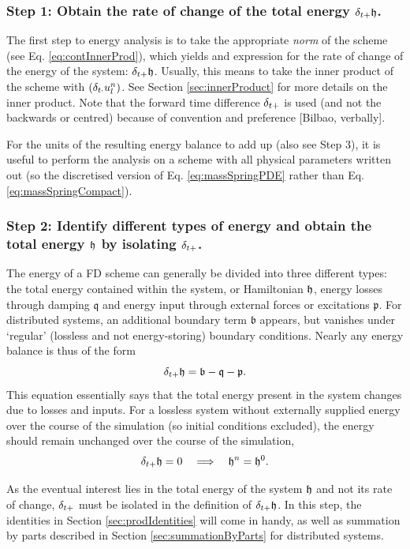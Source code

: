 {{\subsubsection{Step 1: Obtain the rate of change of the total energy $\delta_{t+} \mathfrak{h}$.}
The first step to energy analysis is to take the appropriate \textit{norm} of the scheme (see Eq. \eqref{eq:contInnerProd}), which yields and expression for the rate of change of the energy of the system: $\delta_{t+}\mathfrak{h}$. Usually, this means to take the inner product of the scheme with $(\delta_{t\cdot} u_l^n)$. See Section \ref{sec:innerProduct} for more details on the inner product. Note that the forward time difference $\delta_{t+}$ is used (and not the backwards or centred) because of convention and preference [Bilbao, verbally].

For the units of the resulting energy balance to add up (also see Step 3), it is useful to perform the analysis on a scheme with all physical parameters written out (so the discretised version of Eq. \eqref{eq:massSpringPDE} rather than Eq. \eqref{eq:massSpringCompact}).

\subsubsection{Step 2: Identify different types of energy and obtain the total energy $\mathfrak{h}$ by isolating $\delta_{t+}$.}
The energy of a FD scheme can generally be divided into three different types: the total energy contained within the system, or Hamiltonian $\mathfrak{h}$, energy losses through damping $\mathfrak{q}$ and energy input through external forces or excitations $\mathfrak{p}$. For distributed systems, an additional boundary term $\mathfrak{b}$ appears, but vanishes under `regular' (lossless and not energy-storing) boundary conditions. Nearly any energy balance is thus of the form 
\begin{equation}\label{eq:energyForm}
    \delta_{t+} \mathfrak{h} = \mathfrak{b}-\mathfrak{q} - \mathfrak{p}.
\end{equation}
This equation essentially says that the total energy present in the system changes due to losses and inputs. For a lossless system without externally supplied energy over the course of the simulation (so initial conditions excluded), the energy should remain unchanged over the course of the simulation, 
\begin{equation}\label{eq:unchangedEnergy}
    \delta_{t+} \mathfrak{h} = 0 \quad \Longrightarrow \quad \mathfrak{h}^n = \mathfrak{h}^0.
\end{equation}

As the eventual interest lies in the total energy of the system $\mathfrak{h}$ and not its rate of change, $\delta_{t+}$ must be isolated in the definition of $\delta_{t+} \mathfrak{h}$. In this step, the identities in Section \ref{sec:prodIdentities} will come in handy, as well as summation by parts described in Section \ref{sec:summationByParts} for distributed systems.
 
}}
